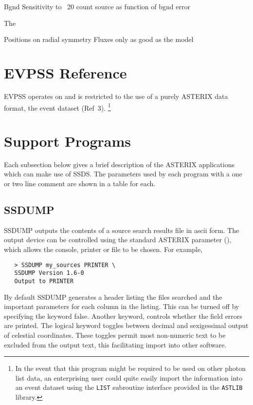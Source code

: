 Bgnd
  Sensitivity to ~20 count source as function of bgnd error

The 


Positions on radial symmetry
Fluxes only as good as the model


\section{EVPSS Reference}

EVPSS operates on and is restricted to the use of a purely ASTERIX data 
format, the event dataset (Ref~3).
\footnote{In the event that
this program might be required to be used on other photon list data, an
enterprising user could quite easily import the information into an
event dataset using the \verb+LIST+ subroutine interface provided in
the \verb+ASTLIB+ library.}

\newpage
\section{Support Programs}
\label{supports}
Each subsection below gives a brief description of the ASTERIX applications
which can make use of SSDS. The parameters used by each program with a
one or two line comment are shown in a table for each.

\subsection{SSDUMP}

\PARtabstart
{}
\PARtabend

SSDUMP outputs the contents of a source search results file in ascii form.
The output device can be controlled using the standard ASTERIX  
parameter (), which allows the console,
printer or file to be chosen. For example,
\begin{verbatim}
   > SSDUMP my_sources PRINTER \
   SSDUMP Version 1.6-0
   Output to PRINTER
\end{verbatim}

By default SSDUMP generates a header listing the files searched and the
important parameters for each column in the listing. This can be turned
off by specifying the \apar{HEADER} keyword false. Another keyword,
\apar{ERRORS} controls whether the field errors are printed. The 
logical keyword toggles between decimal and sexigessimal output of
celestial coordinates. These toggles permit most non-numeric text to be
excluded from the output text, this facilitating import into other software.

